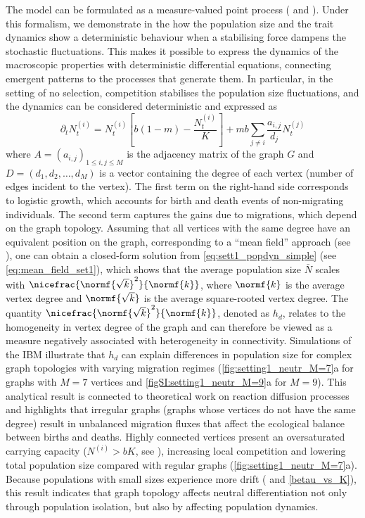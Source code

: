 The model can be formulated as a measure-valued point process (\citep{Bansaye2015} and ). Under this formalism, we demonstrate in the  how the population size and the trait dynamics show a deterministic behaviour when a stabilising force dampens the stochastic fluctuations. This makes it possible to express the dynamics of the macroscopic properties with deterministic differential equations, connecting emergent patterns to the processes that generate them. In particular, in the setting of no selection, competition stabilises the population size fluctuations, and the dynamics can be considered deterministic and expressed as
%
\begin{equation}\label{eq:sett1_popdyn_simple}
  \partial_t N_t^{(i)} = N_t^{(i)} \left[ b(1-m) - \frac{N_t^{(i)}}{K} \right] + m b \sum_{j\neq i}\frac{a_{i,j}}{d_j} N_t^{(j)}
\end{equation}
%
where $A = (a_{i,j})_{1\leq i, j \leq M}$ is the adjacency matrix of the graph $G$ and $D = (d_1,d_2,\dots,d_M)$ is a vector containing the degree of each vertex (number of edges incident to the vertex).
%
The first term on the right-hand side corresponds to logistic growth, which accounts for birth and death events of non-migrating individuals. The second term captures the gains due to migrations, which depend on the graph topology. 
%
Assuming that all vertices with the same degree have an equivalent position on the graph, corresponding to a “mean field” approach (see ), one can obtain a closed-form solution from \cref{eq:sett1_popdyn_simple} (see \cref{eq:mean_field_set1}), which shows that the average population size $\bar{N}$ scales with $\nicefrac{\normf{\sqrt{k}}^2}{\normf{k}}$, where $\normf{k}$ is the average vertex degree and $\normf{\sqrt{k}}$ is the average square-rooted vertex degree. 
%
The quantity $\nicefrac{\normf{\sqrt{k}}^2}{\normf{k}}$, denoted as $h_d$, relates to the homogeneity in vertex degree of the graph and can therefore be viewed as a measure negatively associated with heterogeneity in connectivity. Simulations of the IBM illustrate that $h_d$ can explain differences in population size for complex graph topologies with varying migration regimes (\cref{fig:setting1_neutr_M=7}a for graphs with $M=7$ vertices and \cref{figSI:setting1_neutr_M=9}a for $M=9$). 
%
This analytical result is connected to theoretical work on reaction diffusion processes \citep{Colizza2007} and highlights that irregular graphs (graphs whose vertices do not have the same degree) result in unbalanced migration fluxes that affect the ecological balance between births and deaths. Highly connected vertices present an oversaturated carrying capacity ($N^{(i)} > bK$, see ), increasing local competition and lowering total population size compared with regular graphs (\cref{fig:setting1_neutr_M=7}a).
%
Because populations with small sizes experience more drift (\citep{Burger2000} and \cref{betau_vs_K}), this result indicates that graph topology affects neutral differentiation not only through population isolation, but also by affecting population dynamics.

